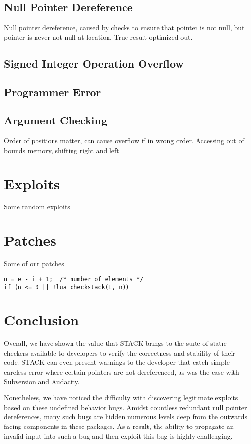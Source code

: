 \documentclass[11pt,twocolumn]{article}
\begin{document}
\subsection{Null Pointer Dereference}
Null pointer dereference, caused by checks to ensure that pointer is not null,
but pointer is never not null at location. True result optimized out.

\subsection{Signed Integer Operation Overflow}

\subsection{Programmer Error}

\subsection{Argument Checking}

Order of positions matter, can cause overflow if in wrong order. Accessing out of bounds memory, shifting right and left


\section{Exploits}
Some random exploits

\section{Patches}
Some of our patches

\begin{lstlisting}
n = e - i + 1;  /* number of elements */
if (n <= 0 || !lua_checkstack(L, n))
\end{lstlisting}

\section{Conclusion}
\label{sec:conclusion}
Overall, we have shown the value that STACK brings to the suite of static checkers available to 
developers to verify the correctness and stability of their code. STACK can even present warnings
to the developer that catch simple careless error where certain pointers are not dereferenced, as
was the case with Subversion and Audacity. 

Nonetheless, we have noticed the difficulty with discovering legitimate exploits based on these
undefined behavior bugs. Amidst countless redundant null pointer dereferences, many such bugs
are hidden numerous levels deep from the outwards facing components in these packages. As a result,
the ability to propagate an invalid input into such a bug and then exploit this bug is highly challenging. 
\end{document}
